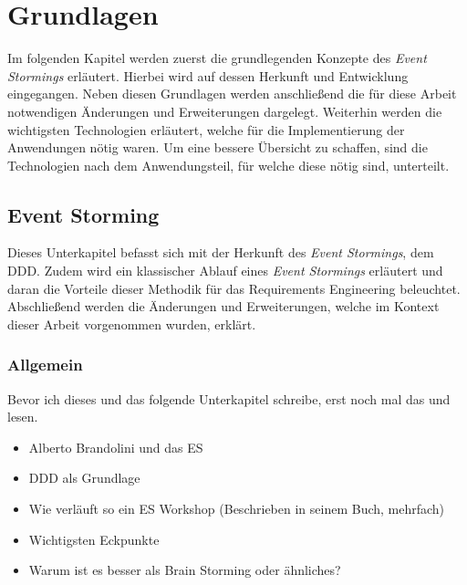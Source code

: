 \chapter{Grundlagen}\label{ch:technologien}
Im folgenden Kapitel werden zuerst die grundlegenden Konzepte des \textit{Event Stormings} erläutert.
Hierbei wird auf dessen Herkunft und Entwicklung eingegangen.
Neben diesen Grundlagen werden anschließend die für diese Arbeit notwendigen Änderungen und Erweiterungen dargelegt.
Weiterhin werden die wichtigsten Technologien erläutert, welche für die Implementierung der Anwendungen nötig waren.
Um eine bessere Übersicht zu schaffen, sind die Technologien nach dem Anwendungsteil, für welche diese nötig sind, unterteilt.

\section{Event Storming}\label{sec:event-storming}
Dieses Unterkapitel befasst sich mit der Herkunft des \textit{Event Stormings}, dem \ac*{DDD}.
Zudem wird ein klassischer Ablauf eines \textit{Event Stormings} erläutert und daran die Vorteile dieser Methodik für das Requirements Engineering beleuchtet.
Abschließend werden die Änderungen und Erweiterungen, welche im Kontext dieser Arbeit vorgenommen wurden, erklärt.

\subsection{Allgemein}\label{subsec:allgemein}
\todo Bevor ich dieses und das folgende Unterkapitel schreibe, erst noch mal das \cite*{dddd} und \cite*{introES} lesen.
\begin{itemize}
    \item Alberto Brandolini und das ES
    \item DDD als Grundlage
    \item Wie verläuft so ein ES Workshop (Beschrieben in seinem Buch, mehrfach)
    \item Wichtigsten Eckpunkte
    \item Warum ist es besser als Brain Storming oder ähnliches?
\end{itemize}

